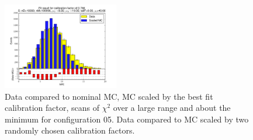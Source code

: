 \begin{figure}[htbp]
\begin{center}
\includegraphics[width=0.45\textwidth]{../FIGURES/05/FIG_Fit_result_for_calibration_factor_of_0_766.pdf} 
\caption{Data compared to nominal MC, MC scaled by the best fit calibration factor, scans of $\chi^2$ over a large range and about the minimum for configuration 05. Data compared to MC scaled by two randomly chosen calibration factors.} 
\label{tab:best_05} 
\end{center} \end{figure} 


